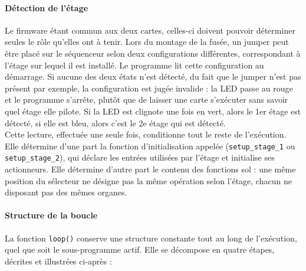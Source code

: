\paragraph*{Détection de l'étage} Le firmware étant commun aux deux cartes, celles-ci doivent pouvoir déterminer seules le rôle
qu'elles ont à tenir. Lors du montage de la fusée, un jumper peut être placé sur le séquenceur selon deux configurations
différentes, correspondant à l'étage sur lequel il est installé. Le programme lit cette configuration au démarrage. Si aucune des
deux états n'est détecté, du fait que le jumper n'est pas présent par exemple, la configuration est jugée invalide : la LED passe
au rouge et le programme s'arrête, plutôt que de laisser une carte s'exécuter sans savoir quel étage elle pilote. Si la LED est
clignote une fois en vert, alors le 1er étage est détecté, si elle est bleu, alors c'est le 2e étage qui est détecté.\\

Cette lecture, effectuée une seule fois, conditionne tout le reste de l'exécution. Elle détermine d'une part la fonction
d'initialisation appelée (\texttt{setup\_stage\_1} ou \texttt{setup\_stage\_2}), qui déclare les entrées utilisées par l'étage
et initialise ses actionneurs. Elle détermine d'autre part le contenu des fonctions sol : une même position du sélecteur ne
désigne pas la même opération selon l'étage, chacun ne disposant pas des mêmes organes.
 
\paragraph*{Structure de la boucle} La fonction \texttt{loop()} conserve une structure constante tout au long de l'exécution,
quel que soit le sous-programme actif. Elle se décompose en quatre étapes, décrites et illustrées ci-après :

\vspace{0.4cm}


